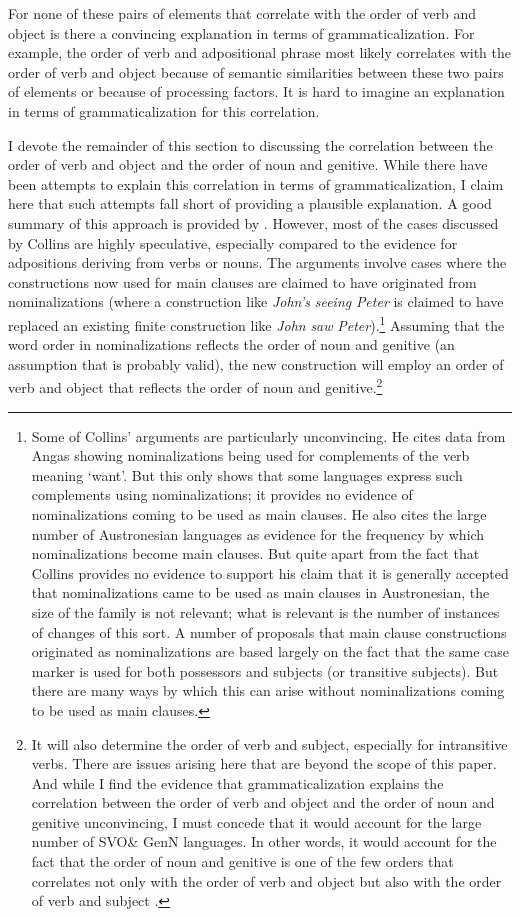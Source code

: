 \documentclass[output=paper]{langsci/langscibook}
\begin{document}
For none of these pairs of elements that correlate with the order of verb and object is there a convincing explanation in terms of grammaticalization. For example, the order of verb and adpositional phrase most likely correlates with the order of verb and object because of semantic similarities between these two pairs of elements or because of processing factors. It is hard to imagine an explanation in terms of grammaticalization for this correlation.

I devote the remainder of this section to discussing the correlation between the order of verb and object and the order of noun and genitive. While there have been attempts to explain this correlation in terms of grammaticalization, I claim here that such attempts fall short of providing a plausible explanation. A good summary of this approach is provided by . However, most of the cases discussed by Collins are highly speculative, especially compared to the evidence for adpositions deriving from verbs or nouns. The arguments involve cases where the constructions now used for main clauses are claimed to have originated from nominalizations (where a construction like \textit{John’s} \textit{seeing} \textit{Peter} is claimed to have replaced an existing finite construction like \textit{John} \textit{saw} \textit{Peter}).\footnote{Some of Collins’ arguments are particularly unconvincing. He cites data from Angas showing nominalizations being used for complements of the verb meaning ‘want’. But this only shows that some languages express such complements using nominalizations; it provides no evidence of nominalizations coming to be used as main clauses. He also cites the large number of Austronesian languages as evidence for the frequency by which nominalizations become main clauses. But quite apart from the fact that Collins provides no evidence to support his claim that it is generally accepted that nominalizations came to be used as main clauses in Austronesian, the size of the family is not relevant; what is relevant is the number of instances of changes of this sort. A number of proposals that main clause constructions originated as nominalizations are based largely on the fact that the same case marker is used for both possessors and subjects (or transitive subjects). But there are many ways by which this can arise without nominalizations coming to be used as main clauses.} Assuming that the word order in nominalizations reflects the order of noun and genitive (an assumption that is probably valid), the new construction will employ an order of verb and object that reflects the order of noun and genitive.\footnote{It will also determine the order of verb and subject, especially for intransitive verbs. There are issues arising here that are beyond the scope of this paper. And while I find the evidence that grammaticalization explains the correlation between the order of verb and object and the order of noun and genitive unconvincing, I must concede that it would account for the large number of SVO\& GenN languages. In other words, it would account for the fact that the order of noun and genitive is one of the few orders that correlates not only with the order of verb and object but also with the order of verb and subject \citep{Dryer2013}.}
\end{document}
